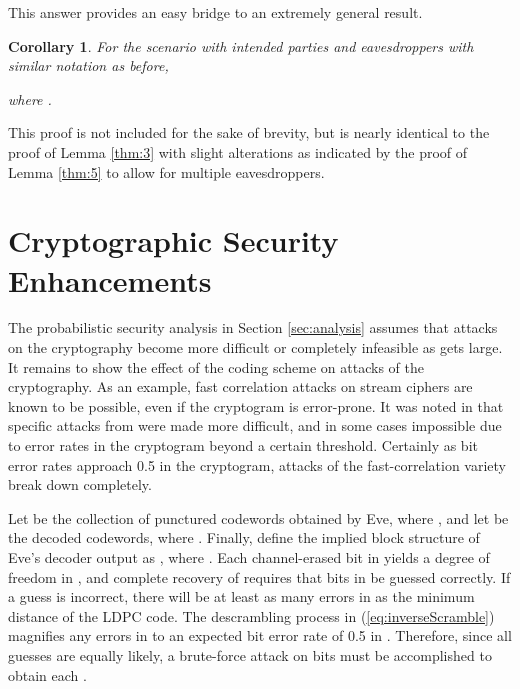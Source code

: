\documentclass[10pt,twocolumn,twoside]{IEEEtran} \newlength{\pic}
\newtheorem{corollary}{Corollary}
\theoremstyle{definition}
\theoremstyle{remark}
\theoremstyle{plain}
\begin{document}
This answer provides an easy bridge to an extremely general result.
\begin{corollary}\label{thm:6}
For the scenario with  intended parties and  eavesdroppers with similar notation as before,
 
 where .
\end{corollary}
\begin{IEEEproof}
 This proof is not included for the sake of brevity, but is nearly identical to the proof of Lemma \ref{thm:3} with slight alterations as indicated by the proof of Lemma \ref{thm:5} to allow for multiple eavesdroppers.
\end{IEEEproof}

\section{Cryptographic Security Enhancements}\label{sec:crypto}
The probabilistic security analysis in Section \ref{sec:analysis} assumes that attacks on the cryptography become more difficult or completely infeasible as  gets large. It remains to show the effect of the coding scheme on attacks of the cryptography. As an example, fast correlation attacks on stream ciphers are known to be possible, even if the cryptogram is error-prone. It was noted in \cite{Harrison09_ICC,Harrison09_ISIT,Harrison09_ITW} that specific attacks from \cite{Meier89} were made more difficult, and in some cases impossible due to error rates in the cryptogram beyond a certain threshold. Certainly as bit error rates approach 0.5 in the cryptogram, attacks of the fast-correlation variety break down completely.

Let  be the collection of punctured codewords obtained by Eve, where , and let  be the decoded codewords, where . Finally, define the implied block structure of Eve's decoder output as , where . Each channel-erased bit in  yields a degree of freedom in , and complete recovery of  requires that  bits in  be guessed correctly. If a guess is incorrect, there will be at least as many errors in  as the minimum distance of the LDPC code. The descrambling process in (\ref{eq:inverseScramble}) magnifies any errors in  to an expected bit error rate of 0.5 in . Therefore, since all guesses are equally likely, a brute-force attack on  bits must be accomplished to obtain each .
\end{document}
